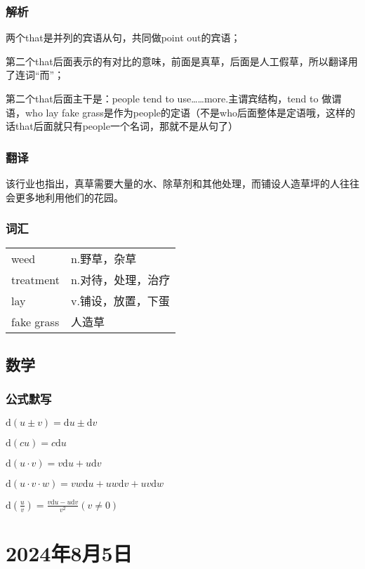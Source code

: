 \documentclass[UTF8]{ctexart}
\begin{document}
\subsubsection{解析}
两个that是并列的宾语从句，共同做point out的宾语；

第二个that后面表示的有对比的意味，前面是真草，后面是人工假草，所以翻译用了连词“而”；

第二个that后面主干是：people tend to use……more.主谓宾结构，tend to 做谓语，who lay fake grass是作为people的定语（不是who后面整体是定语哦，这样的话that后面就只有people一个名词，那就不是从句了）
\subsubsection{翻译}
该行业也指出，真草需要大量的水、除草剂和其他处理，而铺设人造草坪的人往往会更多地利用他们的花园。
\subsubsection{词汇}
\begin{table}[h]
      \centering
      \begin{tabular}{p{}p{}}
            weed       & n.野草，杂草    \\
            treatment  & n.对待，处理，治疗 \\
            lay        & v.铺设，放置，下蛋 \\
            fake grass & 人造草
      \end{tabular}
\end{table}
\subsection{数学}
\subsubsection{公式默写}
\begin{multicols}{2}
      $\mathrm{d}(u\pm v) =\mathrm{d}u\pm \mathrm{d}v$

      $\mathrm{d}(cu)=c\mathrm{d}u$

      $\mathrm{d}(u\cdot v)=v\mathrm{d}u+u\mathrm{d}v$

      $\mathrm{d}(u\cdot v\cdot w)=vw\mathrm{d}u+uw\mathrm{d}v+uv\mathrm{d}w$

      $\mathrm{d}(\frac{u}{v})=\frac{v\mathrm{d}u-u\mathrm{d}v}{v^2}(v\ne 0)$
\end{multicols}
\section{2024年8月5日}
\end{document}
